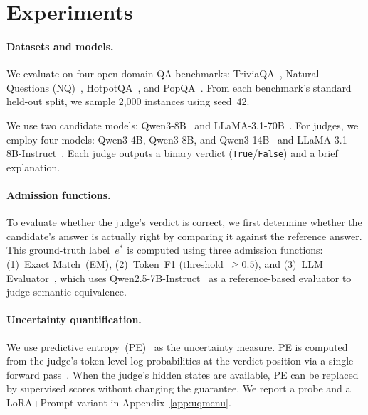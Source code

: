 \section{Experiments}
\label{sec:experiments}

\paragraph{Datasets and models.}
We evaluate on four open-domain QA benchmarks: TriviaQA~\citep{joshi2017triviaqa}, Natural Questions (NQ)~\citep{kwiatkowskietal2019}, HotpotQA~\citep{yang2018hotpotqa}, and PopQA~\citep{mallen2023llm_memorization}. From each benchmark's standard held-out split, we sample 2{,}000 instances using seed~42.

We use two candidate models: Qwen3-8B~\citep{yang2025qwen3technicalreport} and LLaMA-3.1-70B~\citep{grattafiori2024llama3herdmodels}. For judges, we employ four models: Qwen3-4B, Qwen3-8B, and Qwen3-14B~\citep{yang2025qwen3technicalreport} and LLaMA-3.1-8B-Instruct~\citep{grattafiori2024llama3herdmodels}. Each judge outputs a binary verdict (\texttt{True}/\texttt{False}) and a brief explanation.

\paragraph{Admission functions.}
To evaluate whether the judge's verdict is correct, we first determine whether the candidate's answer is actually right by comparing it against the reference answer. This ground-truth label~$e^*$ is computed using three admission functions: (1)~Exact Match~(EM), (2)~Token~F1 (threshold~$\geq 0.5$), and (3)~LLM Evaluator~\citep{badshah2025ref, badshah-clev}, which uses Qwen2.5-7B-Instruct~\citep{qwen2025qwen25technicalreport} as a reference-based evaluator to judge semantic equivalence.

\paragraph{Uncertainty quantification.}
We use predictive entropy~(PE)~\citep{malinin2021uncertainty} as the uncertainty measure. PE is computed from the judge's token-level log-probabilities at the verdict position via a single forward pass~\citep{kadavath2022languagemodelsmostlyknow}. When the judge's hidden states are available, PE can be replaced by supervised scores without changing the guarantee. We report a probe and a LoRA+Prompt variant in Appendix~\ref{app:uqmenu}.

